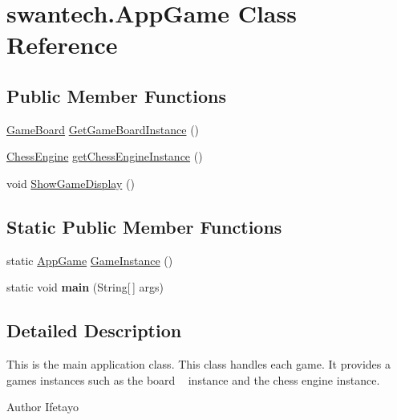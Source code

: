 \hypertarget{classswantech_1_1_app_game}{}\section{swantech.\+App\+Game Class Reference}
\label{classswantech_1_1_app_game}
\subsection*{Public Member Functions}
\begin{DoxyCompactItemize}
\item 
\hyperlink{classswantech_1_1_game_board}{Game\+Board} \hyperlink{classswantech_1_1_app_game_a9751af8444b8e7701201545bb84737ba}{Get\+Game\+Board\+Instance} ()
\item 
\hyperlink{classswantech_1_1_chess_engine}{Chess\+Engine} \hyperlink{classswantech_1_1_app_game_ab4cc6220fbfbc5497b292035e0d95436}{get\+Chess\+Engine\+Instance} ()
\item 
void \hyperlink{classswantech_1_1_app_game_ab01ef73e8ce1e2b21a58daad0ad535a1}{Show\+Game\+Display} ()
\end{DoxyCompactItemize}
\subsection*{Static Public Member Functions}
\begin{DoxyCompactItemize}
\item 
static \hyperlink{classswantech_1_1_app_game}{App\+Game} \hyperlink{classswantech_1_1_app_game_a787d970e7a546bb0aabd34b7d7d43358}{Game\+Instance} ()
\item 
\hypertarget{classswantech_1_1_app_game_ae4539dec0adb6828afdbdbb8662e4d1d}{}static void {\bfseries main} (String\mbox{[}$\,$\mbox{]} args)\label{classswantech_1_1_app_game_ae4539dec0adb6828afdbdbb8662e4d1d}

\end{DoxyCompactItemize}


\subsection{Detailed Description}
This is the main application class. This class handles each game. It provides a game\textquotesingle{}s instances such as the board ~\newline
 instance and the chess engine instance. \begin{DoxyAuthor}{Author}
Ifetayo 
\end{DoxyAuthor}


